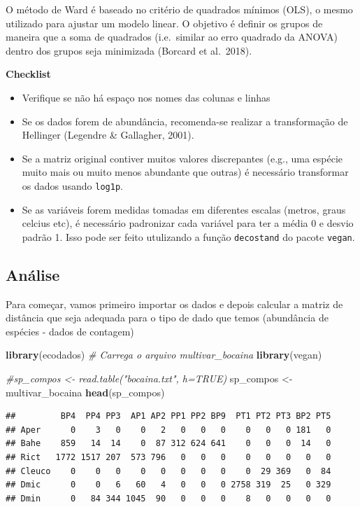 \documentclass[
]{book}
\newenvironment{Shaded}{\begin{snugshade}}{\end{snugshade}}
\newcommand{\CommentTok}[1]{\textcolor[rgb]{0.56,0.35,0.01}{\textit{#1}}}
\newcommand{\KeywordTok}[1]{\textcolor[rgb]{0.13,0.29,0.53}{\textbf{#1}}}
\newcommand{\NormalTok}[1]{#1}
\newcommand{\StringTok}[1]{\textcolor[rgb]{0.31,0.60,0.02}{#1}}
\providecommand{\tightlist}{%
  \setlength{\itemsep}{0pt}\setlength{\parskip}{0pt}}
\begin{document}
O método de Ward é baseado no critério de quadrados mínimos (OLS), o mesmo utilizado para ajustar um modelo linear. O objetivo é definir os grupos de maneira que a soma de quadrados (i.e.~similar ao erro quadrado da ANOVA) dentro dos grupos seja minimizada (Borcard et al.~2018).

\textbf{Checklist}

\begin{itemize}
\tightlist
\item
  Verifique se não há espaço nos nomes das colunas e linhas
\item
  Se os dados forem de abundância, recomenda-se realizar a transformação de Hellinger (Legendre \& Gallagher, 2001).
\item
  Se a matriz original contiver muitos valores discrepantes (e.g., uma espécie muito mais ou muito menos abundante que outras) é necessário transformar os dados usando \texttt{log1p}.
\item
  Se as variáveis forem medidas tomadas em diferentes escalas (metros, graus celcius etc), é necessário padronizar cada variável para ter a média 0 e desvio padrão 1. Isso pode ser feito utulizando a função \texttt{decostand} do pacote \texttt{vegan}.
\end{itemize}

\hypertarget{anuxe1lise}{%
\subsection{Análise}\label{anuxe1lise}}

Para começar, vamos primeiro importar os dados e depois calcular a matriz de distância que seja adequada para o tipo de dado que temos (abundância de espécies - dados de contagem)

\begin{Shaded}
\begin{Highlighting}[]
\KeywordTok{library}\NormalTok{(ecodados) }\CommentTok{# Carrega o arquivo multivar_bocaina}
\KeywordTok{library}\NormalTok{(vegan)}


\CommentTok{#sp_compos <- read.table("bocaina.txt", h=TRUE)}
\NormalTok{sp_compos  <-}\StringTok{ }\NormalTok{multivar_bocaina}
\KeywordTok{head}\NormalTok{(sp_compos)}
\end{Highlighting}
\end{Shaded}

\begin{verbatim}
##         BP4  PP4 PP3  AP1 AP2 PP1 PP2 BP9  PT1 PT2 PT3 BP2 PT5
## Aper      0    3   0    0   2   0   0   0    0   0   0 181   0
## Bahe    859   14  14    0  87 312 624 641    0   0   0  14   0
## Rict   1772 1517 207  573 796   0   0   0    0   0   0   0   0
## Cleuco    0    0   0    0   0   0   0   0    0  29 369   0  84
## Dmic      0    0   6   60   4   0   0   0 2758 319  25   0 329
## Dmin      0   84 344 1045  90   0   0   0    8   0   0   0   0
\end{verbatim}
\end{document}

